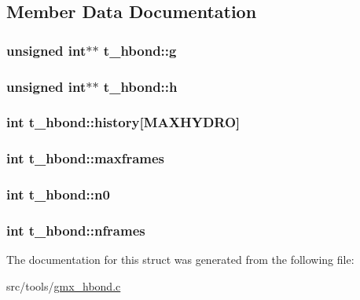 \subsection{\-Member \-Data \-Documentation}
\hypertarget{structt__hbond_a3be48d0bb46c6f5ba823b88dc8ae38bb}{
\subsubsection[{g}]{\setlength{\rightskip}{0pt plus 5cm}unsigned int$\ast$$\ast$ {\bf t\-\_\-hbond\-::g}}}\label{structt__hbond_a3be48d0bb46c6f5ba823b88dc8ae38bb}
\hypertarget{structt__hbond_a9d5d8b9047649f6bfc0d10414036a67c}{
\subsubsection[{h}]{\setlength{\rightskip}{0pt plus 5cm}unsigned int$\ast$$\ast$ {\bf t\-\_\-hbond\-::h}}}\label{structt__hbond_a9d5d8b9047649f6bfc0d10414036a67c}
\hypertarget{structt__hbond_a51c4794e821837922fd035142f9459ae}{
\subsubsection[{history}]{\setlength{\rightskip}{0pt plus 5cm}int {\bf t\-\_\-hbond\-::history}\mbox{[}{\bf \-M\-A\-X\-H\-Y\-D\-R\-O}\mbox{]}}}\label{structt__hbond_a51c4794e821837922fd035142f9459ae}
\hypertarget{structt__hbond_a479a04e9b60612ffcef8514673862665}{
\subsubsection[{maxframes}]{\setlength{\rightskip}{0pt plus 5cm}int {\bf t\-\_\-hbond\-::maxframes}}}\label{structt__hbond_a479a04e9b60612ffcef8514673862665}
\hypertarget{structt__hbond_a9824d6f3b7035dfde2a4996b65f65613}{
\subsubsection[{n0}]{\setlength{\rightskip}{0pt plus 5cm}int {\bf t\-\_\-hbond\-::n0}}}\label{structt__hbond_a9824d6f3b7035dfde2a4996b65f65613}
\hypertarget{structt__hbond_a1d43963290a2aa7894d60cbd4bb1f2b0}{
\subsubsection[{nframes}]{\setlength{\rightskip}{0pt plus 5cm}int {\bf t\-\_\-hbond\-::nframes}}}\label{structt__hbond_a1d43963290a2aa7894d60cbd4bb1f2b0}


\-The documentation for this struct was generated from the following file\-:\begin{DoxyCompactItemize}
\item 
src/tools/\hyperlink{gmx__hbond_8c}{gmx\-\_\-hbond.\-c}\end{DoxyCompactItemize}
